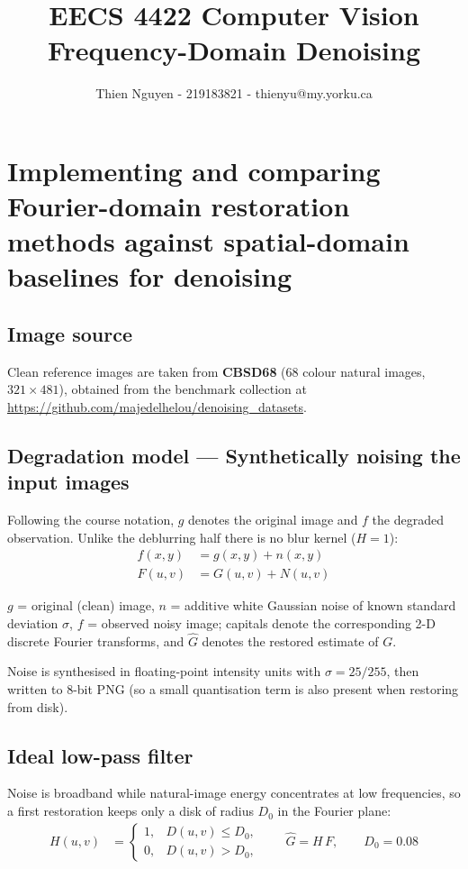 \documentclass[10pt,twocolumn,letterpaper]{article}
\title{\textbf{EECS 4422 Computer Vision}\\[4pt]
       \large Frequency-Domain Denoising}
\author{Thien Nguyen - 219183821 - thienyu@my.yorku.ca}
\date{}
\begin{document}
\maketitle

\section*{Implementing and comparing Fourier-domain restoration methods against spatial-domain baselines for denoising}

\subsection*{Image source}

Clean reference images are taken from \textbf{CBSD68} (68 colour natural images,
$321 \times 481$), obtained from the benchmark collection at
\url{https://github.com/majedelhelou/denoising_datasets}.

\subsection*{Degradation model --- Synthetically noising the input images}

Following the course notation, $g$ denotes the original image and $f$ the degraded
observation.  Unlike the deblurring half there is no blur kernel ($H = 1$):
\begin{align}
  f(x,y) &= g(x,y) + n(x,y) \\
  F(u,v) &= G(u,v) + N(u,v)
\end{align}

\noindent $g$ = original (clean) image, $n$ = additive white Gaussian noise of known
standard deviation $\sigma$, $f$ = observed noisy image; capitals denote the
corresponding 2-D discrete Fourier transforms, and $\hat{G}$ denotes the restored
estimate of $G$.

\noindent Noise is synthesised in floating-point intensity units with
$\sigma = 25/255$, then written to 8-bit PNG (so a small quantisation term is also
present when restoring from disk).

\newpage
\subsection*{Ideal low-pass filter}

Noise is broadband while natural-image energy concentrates at low frequencies, so a
first restoration keeps only a disk of radius $D_0$ in the Fourier plane:
\begin{align}
  H(u,v) &=
  \begin{cases}
    1, & D(u,v) \le D_0, \\
    0, & D(u,v) > D_0,
  \end{cases}
  \qquad
  \hat{G} = H\,F,
  \qquad D_0 = 0.08
\end{align}
\end{document}
